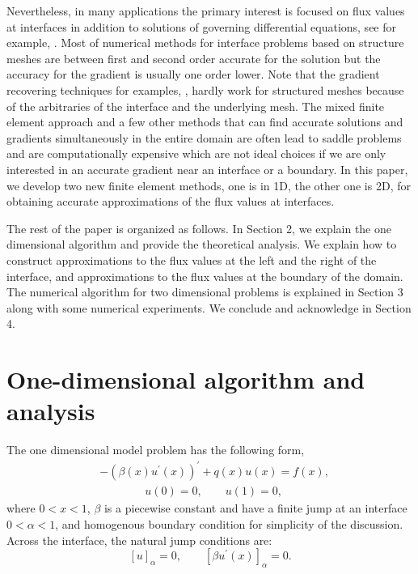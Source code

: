 \documentclass[11pt]{article}
\numberwithin{equation}{section}
\begin{document}
Nevertheless, in many applications the primary interest
is focused on flux values at interfaces
in addition to solutions of governing differential equations,
see for example, \cite{chou2012immersed, douglas1974galerkin, wheeler1974galerkin}.
Most of numerical methods for interface problems based on structure meshes
are between first and second order accurate for the solution
but the accuracy for the gradient is usually one order lower.
Note that the gradient recovering techniques for examples, \cite{wahlbin1995superconvergence, zhang2005new},
hardly work for structured meshes because of the arbitraries of the interface and the underlying mesh.
The mixed finite element approach and a few other methods
that can find accurate solutions and  gradients simultaneously
in the entire domain are often lead to saddle problems
and are computationally expensive
which are not ideal choices
if we are only interested in an accurate gradient near an interface or a boundary.
In this paper, we develop two new finite element methods, one is in 1D, the other one is 2D,
for obtaining  accurate approximations of the flux values at interfaces.

The rest of the paper is organized as follows.
In Section 2,
we explain the one dimensional algorithm and provide the theoretical analysis.
We explain how to construct approximations to the flux values at the left and the right of the interface,
and approximations to the flux values at the boundary of the domain.
The numerical algorithm for two dimensional problems is explained in Section 3 along with some numerical experiments.
We conclude and acknowledge in Section 4.


\section{One-dimensional algorithm and analysis}

The one dimensional model problem has the following form,
\begin{equation}\label{sol ch2}
\begin{split}
& -\left(\beta\left(x\right) u^{'}(x)\right)^{'}+q\left(x\right) u\left(x\right)=f\left(x\right),\\
&\qquad \qquad u\left(0\right)=0,\qquad u\left(1\right)=0,
\end{split}
\end{equation}
where $0<x<1$,
$\beta$ is a piecewise  constant and have a finite jump  at an interface $0<\alpha<1$,
and homogenous boundary condition for simplicity of the discussion.
Across the interface,  the natural jump conditions are:
\begin{equation} \label{jumpcond ch2}
 \left[ u\right]_{\alpha} =0,  \qquad  \left[\beta  u^{'}(x)\right]_{\alpha}=0.
\end{equation}
\end{document}
